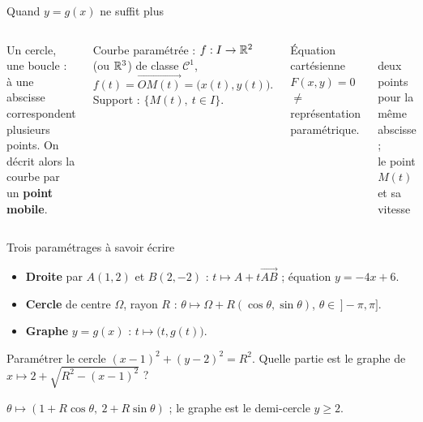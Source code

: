 \documentclass[aspectratio=169,11pt]{beamer}
\newcommand{\vv}[1]{\overrightarrow{#1}}\newcommand{\ve}[1]{\vec{#1}}
\newcommand{\rep}[1]{\textcolor{Vert}{#1}}%
\begin{document}
\begin{frame}{Quand $y=g(x)$ ne suffit plus}
\begin{columns}[c]
Un cercle, une boucle : à une abscisse correspondent \alert{plusieurs points}. On décrit alors la courbe par un \textbf{point
mobile}.
\pause
\begin{DEF}
Courbe paramétrée : $f:I\to\mathbb{R}^2$ (ou $\mathbb{R}^3$) de classe $\mathcal C^1$,
\[f(t)=\vv{OM(t)}=\big(x(t),y(t)\big).\]
Support : $\{M(t),\ t\in I\}$.
\end{DEF}
\pause
Équation cartésienne $F(x,y)=0$ $\neq$ représentation paramétrique.
\centering{}
\\
{\scriptsize deux points pour la même abscisse ;\\ le point $M(t)$ et sa vitesse}
\end{columns}
\end{frame}

\begin{frame}{Trois paramétrages à savoir écrire}
\begin{EX}
\begin{itemize}
\item \textbf{Droite} par $A(1,2)$ et $B(2,-2)$ : $t\mapsto A+t\vv{AB}$ ; équation $y=-4x+6$.
\item \textbf{Cercle} de centre $\Omega$, rayon $R$ : $\theta\mapsto\Omega+R(\cos\theta,\sin\theta)$, $\theta\in\,]-\pi,\pi]$.
\item \textbf{Graphe} $y=g(x)$ : $t\mapsto\big(t,g(t)\big)$.
\end{itemize}
\end{EX}
\pause
\begin{ATOI}
Paramétrer le cercle $(x-1)^2+(y-2)^2=R^2$. Quelle partie est le graphe de $x\mapsto2+\sqrt{R^2-(x-1)^2}$ ?
\end{ATOI}
\pause
\rep{$\theta\mapsto(1+R\cos\theta,\ 2+R\sin\theta)$} ; le graphe est le \rep{demi-cercle $y\geq2$}.
\end{frame}
\end{document}
